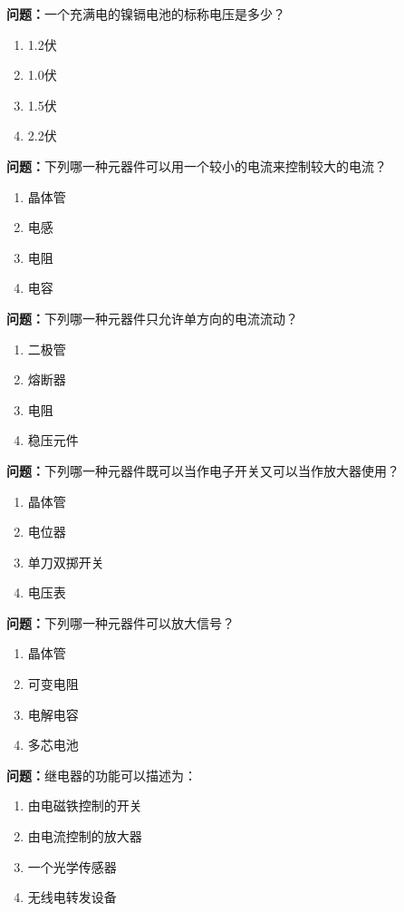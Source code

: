 \noindent\textbf{问题：}一个充满电的镍镉电池的标称电压是多少？
\begin{enumerate}[label=\Alph*), leftmargin=3em]
\item 1.2伏
\item 1.0伏
\item 1.5伏
\item 2.2伏
\end{enumerate}

\bigskip


\noindent\textbf{问题：}下列哪一种元器件可以用一个较小的电流来控制较大的电流？
\begin{enumerate}[label=\Alph*), leftmargin=3em]
\item 晶体管
\item 电感
\item 电阻
\item 电容
\end{enumerate}

\bigskip


\noindent\textbf{问题：}下列哪一种元器件只允许单方向的电流流动？
\begin{enumerate}[label=\Alph*), leftmargin=3em]
\item 二极管
\item 熔断器
\item 电阻
\item 稳压元件
\end{enumerate}

\bigskip


\noindent\textbf{问题：}下列哪一种元器件既可以当作电子开关又可以当作放大器使用？
\begin{enumerate}[label=\Alph*), leftmargin=3em]
\item 晶体管
\item 电位器
\item 单刀双掷开关
\item 电压表
\end{enumerate}

\bigskip


\noindent\textbf{问题：}下列哪一种元器件可以放大信号？
\begin{enumerate}[label=\Alph*), leftmargin=3em]
\item 晶体管
\item 可变电阻
\item 电解电容
\item 多芯电池
\end{enumerate}

\bigskip


\noindent\textbf{问题：}继电器的功能可以描述为：
\begin{enumerate}[label=\Alph*), leftmargin=3em]
\item 由电磁铁控制的开关
\item 由电流控制的放大器
\item 一个光学传感器
\item 无线电转发设备
\end{enumerate}

